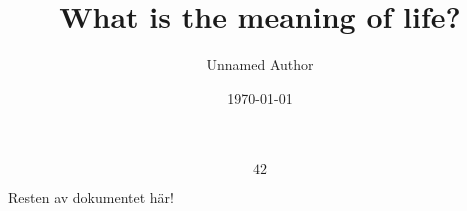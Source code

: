 \documentclass[a4paper,12pt]{article}   %
\title{What is the meaning of life?}
\author{Unnamed Author}
\date{\today}
\begin{document}
\maketitle              %

\[ 42 \]

Resten av dokumentet här!

%
\end{document}
